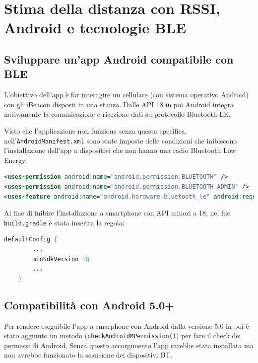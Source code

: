 \chapter{Stima della distanza con RSSI, Android e tecnologie BLE}

\section{Sviluppare un'app Android compatibile con BLE}
L'obiettivo dell'app è far interagire un cellulare (con sistema operativo Android) con gli iBeacon disposti in una stanza. Dalle API 18 in poi Android integra nativamente la comunicazione e ricezione dati su protocollo Bluetooth LE.

Visto che l'applicazione non funziona senza questa specifica, nell'\texttt{AndroidManifest.xml} sono state imposte delle condizioni che inibiscono l'installazione dell'app a dispositivi che non hanno una radio Bluetooth Low Energy.

\begin{lstlisting}[language=XML]
<uses-permission android:name="android.permission.BLUETOOTH" />
<uses-permission android:name="android.permission.BLUETOOTH_ADMIN" />
<uses-feature android:name="android.hardware.bluetooth_le" android:required="true" />
\end{lstlisting}

Al fine di inibire l'installazione a smartphone con API minori a 18, nel file \texttt{build.gradle} è stata inserita la regola:
\begin{lstlisting}[language=Java]
    defaultConfig {
    	...
    	minSdkVersion 18
    	...
    }
\end{lstlisting}

\section{Compatibilità con Android 5.0+}
Per rendere eseguibile l'app a smarphone con Android dalla versione 5.0 in poi è stato aggiunto un metodo (\texttt{checkAndroidMPermission()}) per fare il check dei permessi di Android. Senza questo accorgimento l'app sarebbe stata installata ma non avrebbe funzionato la scansione dei dispositivi BT.

